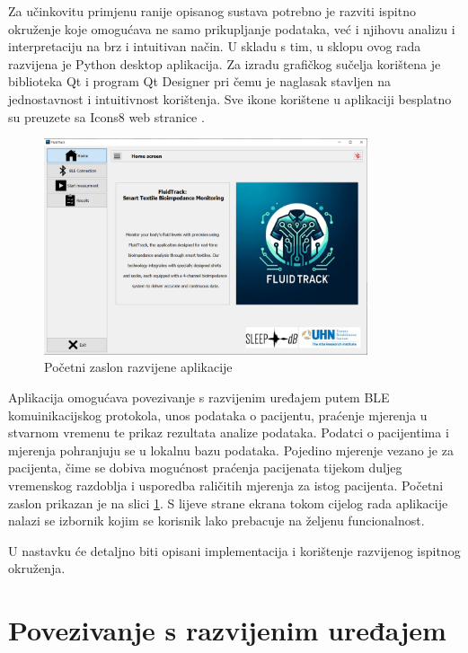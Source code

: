 \documentclass[../diplomski_rad.tex]{subfiles}
\begin{document}
\sloppy

\justifying

Za učinkovitu primjenu ranije opisanog sustava potrebno je 
razviti ispitno okruženje koje omogućava ne samo prikupljanje podataka, 
već i njihovu analizu i interpretaciju na brz i intuitivan način.
U skladu s tim, u sklopu ovog rada razvijena je Python desktop aplikacija. 
Za izradu grafičkog sučelja korištena je biblioteka Qt i program Qt Designer pri čemu je 
naglasak stavljen na jednostavnost i intuitivnost korištenja.
Sve ikone korištene u aplikaciji besplatno su preuzete sa Icons8 web stranice \cite{ikone}.

\begin{figure}[htb]
    \centering
    \includegraphics[width=0.85\textwidth]{Figures/home.png} 
    \caption{Početni zaslon razvijene aplikacije}
    \label{slk:home}
\end{figure}

Aplikacija omogućava povezivanje s razvijenim uređajem putem BLE komuinikacijskog protokola, 
unos podataka o pacijentu,  
praćenje mjerenja u stvarnom vremenu te prikaz rezultata analize podataka. 
Podatci o pacijentima i mjerenja pohranjuju se u lokalnu bazu podataka. 
Pojedino mjerenje vezano je za pacijenta, čime se dobiva mogućnost praćenja pacijenata 
tijekom duljeg vremenskog razdoblja i usporedba raličitih mjerenja za istog pacijenta.
Početni zaslon prikazan je na slici \ref{slk:home}. 
S lijeve strane ekrana tokom cijelog rada aplikacije nalazi se izbornik kojim se korisnik lako prebacuje 
na željenu funcionalnost.  

U nastavku će detaljno biti opisani implementacija i korištenje razvijenog ispitnog okruženja.

\section{Povezivanje s razvijenim uređajem}
\end{document}
